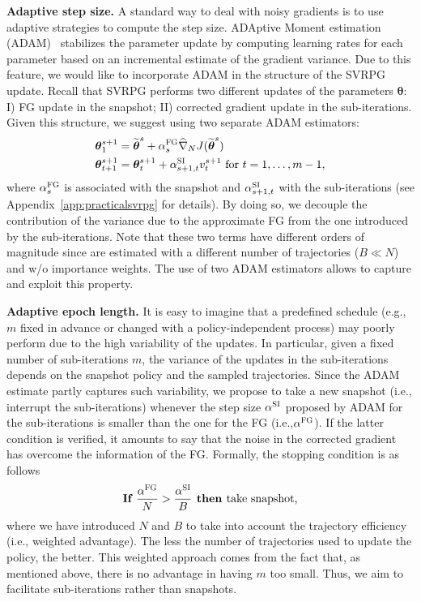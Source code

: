 \documentclass{article}
\makeatletter
\theoremstyle{remark}
\theoremstyle{definition}
\DeclareRobustCommand{\eg}{e.g.,\@\xspace}
\DeclareRobustCommand{\ie}{i.e.,\@\xspace}
\newcommand{\vtheta}{\boldsymbol{\theta}}
\newcommand{\wt}[1]{\widetilde{#1}}
\newcommand{\wh}[1]{\widehat{#1}}
\makeatother
\begin{document}
\textbf{Adaptive step size.}
A standard way to deal with noisy gradients is to use adaptive strategies to compute the step size.
ADAptive Moment estimation (ADAM)~\citep{kingma2014adam} stabilizes the parameter update by computing learning rates for each parameter based on an incremental estimate of the gradient variance.
Due to this feature, we would like to incorporate ADAM in the structure of the SVRPG update.
Recall that SVRPG performs two different updates of the parameters $\vtheta$: I) FG update in the snapshot; II) corrected gradient update in the sub-iterations.
Given this structure, we suggest using two separate ADAM estimators:
\begin{align*}
        \vtheta^{s+1}_1 &= \wt{\vtheta}^s + \alpha^{\textsc{FG}}_s\wh{\nabla}_N J(\wt{\vtheta}^s)\\
        \vtheta^{s+1}_{t+1} &= \vtheta^{s+1}_t + \alpha^{\textsc{SI}}_{s+1,t} v_t^{s+1} \text{ for $t=1,\dots,m-1$},
\end{align*}
where $\alpha^{\textsc{FG}}_{s}$ is associated with the snapshot and $\alpha^{\textsc{SI}}_{s+1,t}$ with the sub-iterations (see Appendix~\ref{app:practicalsvrpg} for details).
By doing so, we decouple the contribution of the variance due to the approximate FG from the one introduced by the sub-iterations.
Note that these two terms have different orders of magnitude since are estimated with a different number of trajectories ($B \ll N$) and w/o importance weights.
The use of two ADAM estimators allows to capture and exploit this property.

\textbf{Adaptive epoch length.}
It is easy to imagine that a predefined schedule (\eg $m$ fixed in advance or changed with a policy-independent process) may poorly perform due to the high variability of the updates.
In particular, given a fixed number of sub-iterations $m$, the variance of the updates in the sub-iterations depends on the snapshot policy and the sampled trajectories.
Since the ADAM estimate partly captures such variability,  we propose to take a new snapshot (\ie interrupt the sub-iterations) whenever the step size $\alpha^{\textsc{SI}}$ proposed by ADAM for the sub-iterations is smaller than the one for the FG (\ie $\alpha^{\textsc{FG}}$).
If the latter condition is verified, it amounts to say that the noise in the corrected gradient has overcome the information of the FG.
Formally, the stopping condition is as follows
\[
        \textbf{If }        \frac{\alpha^{\textsc{FG}}}{N} > \frac{\alpha^{\textsc{SI}}}{B} \textbf{ then } \text{take snapshot,}
\]
where we have introduced $N$ and $B$ to take into account the trajectory efficiency (\ie weighted advantage).
The less the number of trajectories used to update the policy, the better.
This weighted approach comes from the fact that, as mentioned above, there is no advantage in having $m$ too small.
Thus, we aim to facilitate sub-iterations rather than snapshots.
\end{document}
